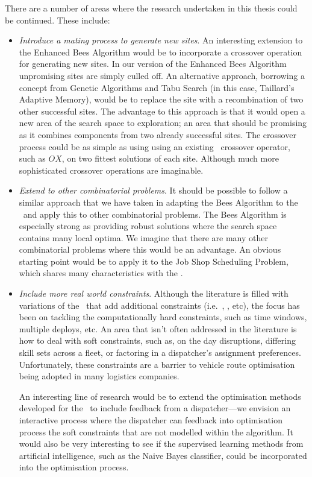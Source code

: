 There are a number of areas where the research undertaken in this thesis could be continued. These include:

\begin{itemize}

   \item \emph{Introduce a mating process to generate new sites}. An interesting extension to the Enhanced Bees Algorithm would be to incorporate a crossover operation for generating new sites. In our version of the Enhanced Bees Algorithm unpromising sites are simply culled off. An alternative approach, borrowing a concept from Genetic Algorithms and Tabu Search (in this case, Taillard's Adaptive Memory), would be to replace the site with a recombination of two other successful sites. The advantage to this approach is that it would open a new area of the search space to exploration; an area that should be promising as it combines components from two already successful sites. The crossover process could be as simple as using using an existing \VRP\ crossover operator, such as $OX$, on two fittest solutions of each site. Although much more sophisticated crossover operations are imaginable.

   \item \emph{Extend to other combinatorial problems}. It should be possible to follow a similar approach that we have taken in adapting the Bees Algorithm to the \VRP\ and apply this to other combinatorial problems. The Bees Algorithm is especially strong as providing robust solutions where the search space contains many local optima. We imagine that there are many other combinatorial problems where this would be an advantage. An obvious starting point would be to apply it to the Job Shop Scheduling Problem, which shares many characteristics with the \VRP.

   \item \emph{Include more real world constraints}. Although the literature is filled with variations of the \VRP\ that add additional constraints (i.e.~\VRPTW, \PDP, etc), the focus has been on tackling the computationally hard constraints, such as time windows, multiple deploys, etc. An area that isn't often addressed in the literature is how to deal with soft constraints, such as, on the day disruptions, differing skill sets across a fleet, or factoring in a dispatcher's assignment preferences. Unfortunately, these constraints are a barrier to vehicle route optimisation being adopted in many logistics companies. 
   
   An interesting line of research would be to extend the optimisation methods developed for the \VRP\ to include feedback from a dispatcher---we envision an interactive process where the dispatcher can feedback into optimisation process the soft constraints that are not modelled within the algorithm. It would also be very interesting to see if the supervised learning methods from artificial intelligence, such as the Naive Bayes classifier, could be incorporated into the optimisation process.
      
\end{itemize}

